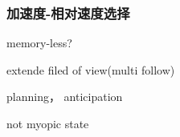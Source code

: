 \subsubsection{加速度-相对速度选择}

memory-less?

extende filed of view(multi follow)

planning， anticipation

not myopic state






